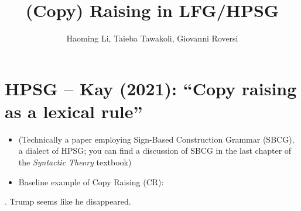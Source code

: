 \documentclass[11pt]{article}
\title{(Copy) Raising in LFG/HPSG}
\author{Haoming Li, Taieba Tawakoli, Giovanni Roversi}
\begin{document}
\maketitle

\section{HPSG – Kay (2021): ``Copy raising as a lexical rule''}
\label{sec:sbcg_a_dialect_of_hpsg}



\begin{itemize}
  \item (Technically a paper employing Sign-Based Construction Grammar (SBCG), a dialect of HPSG; you can find a discussion of SBCG in the last chapter of the \textit{Syntactic Theory} textbook)

  \item Baseline example of Copy Raising (CR):
\end{itemize}
\ex. Trump seems like he disappeared.
\end{document}
